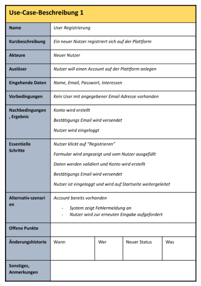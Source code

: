 \documentclass[11pt, a4paper]{article}
\begin{document}
\begin{figure}[ht]
    \centering
    \begin{minipage}[t]{0.45\textwidth}
        \centering \includegraphics[width=0.9\textwidth]{UseCase-13.png} \\
    \end{minipage}
    \centering
    \begin{minipage}[t]{0.45\textwidth}

\end{minipage}
\end{figure}
\end{document}
